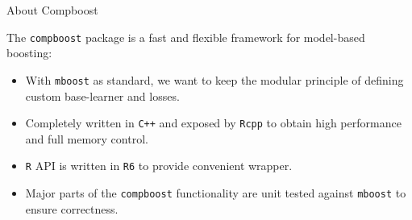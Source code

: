 \documentclass[10pt]{beamer}\usepackage[]{graphicx}\usepackage[]{color}
\begin{document}
\begin{frame}{About Compboost}


The \texttt{compboost} package is a fast and flexible framework for model-based boosting:

\begin{itemize}

  \item
    With \texttt{mboost} as standard, we want to keep the modular principle of defining custom base-learner and losses.

  \item
    Completely written in \texttt{C++} and exposed by \texttt{Rcpp} to obtain high performance and full memory control.

  \item
    \texttt{R} API is written in \texttt{R6} to provide convenient wrapper.

  \item
    Major parts of the \texttt{compboost} functionality are unit tested against \texttt{mboost} to ensure correctness.

\end{itemize}

\end{frame}
\end{document}
